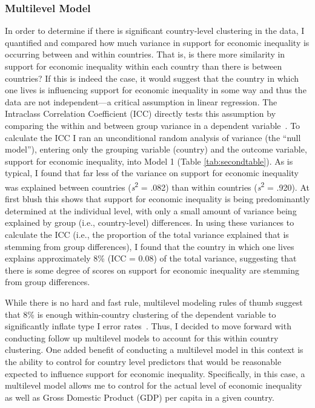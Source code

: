 \documentclass{sfuthesis}
\begin{document}
\subsubsection{Multilevel Model}
In order to determine if there is significant country-level clustering in the data, I quantified and compared how much variance in support for economic inequality is occurring between and within countries. That is, is there more similarity in support for economic inequality within each country than there is between countries? If this is indeed the case, it would suggest that the country in which one lives is influencing support for economic inequality in some way and thus the data are not independent—a critical assumption in linear regression. The Intraclass Correlation Coefficient (ICC) directly tests this assumption by comparing the within and between group variance in a dependent variable~\cite{killip04}. To calculate the ICC I ran an unconditional random analysis of variance (the “null model”), entering only the grouping variable (country) and the outcome variable, support for economic inequality, into Model 1 (Table \ref{tab:secondtable}). As is typical, I found that far less of the variance on support for economic inequality was explained between countries (\textit{s}\textsuperscript{2} = .082) than within countries (\textit{s}\textsuperscript{2} = .920). At first blush this shows that support for economic inequality is being predominantly determined at the individual level, with only a small amount of variance being explained by group (i.e., country-level) differences. In using these variances to calculate the ICC (i.e., the proportion of the total variance explained that is stemming from group differences), I found that the country in which one lives explains approximately 8\% (ICC = 0.08) of the total variance, suggesting that there is some degree of scores on support for economic inequality are stemming from group differences. 

While there is no hard and fast rule, multilevel modeling rules of thumb suggest that 8\% is enough within-country clustering of the dependent variable to significantly inflate type I error rates~\cite{killip04}. Thus, I decided to move forward with conducting follow up multilevel models to account for this within country clustering. One added benefit of conducting a multilevel model in this context is the ability to control for country level predictors that would be reasonable expected to influence support for economic inequality. Specifically, in this case, a multilevel model allows me to control for the actual level of economic inequality as well as Gross Domestic Product (GDP) per capita in a given country.
\end{document}
